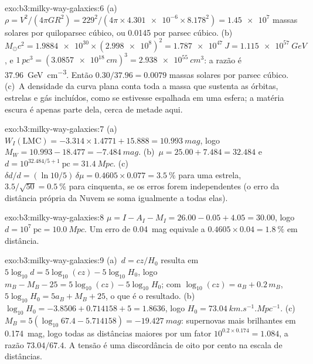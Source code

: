 \begin{solution}{exo:b3:milky-way-galaxies:6}
(a)~$\rho = V^2/(4\pi GR^2) = 229^2/(4\pi\times\num{4.301e-6}\times
8.178^2) = \num{1.45e7}$ massas solares por quiloparsec cúbico, ou
\num{0.0145} por parsec cúbico. (b)~$M_\odot c^2 = \num{1.9884e30}\times
(\num{2.998e8})^2 = \qty{1.787e47}{J} = \qty{1.115e57}{GeV}$, e
$\qty{1}{pc^3} = (\qty{3.0857e18}{cm})^3 = \qty{2.938e55}{cm^3}$: a
razão é \qty{37.96}{GeV.cm^{-3}}. Então $0.30/37.96 = \num{0.0079}$ massas solares
por parsec cúbico. (c)~A densidade da curva plana conta toda a massa
que sustenta as órbitas, estrelas e gás incluídos, como se estivesse espalhada em uma
esfera; a matéria escura é apenas parte dela, cerca de metade aqui.
\end{solution}

\begin{solution}{exo:b3:milky-way-galaxies:7}
(a)~$W_I(\mathrm{LMC}) = -3.314\times1.4771 + 15.888 = \qty{10.993}{mag}$,
logo $M_W = 10.993 - 18.477 = \qty{-7.484}{mag}$. (b)~$\mu = 25.00 + 7.484 =
32.484$ e $d = 10^{32.484/5 + 1}~\mathrm{pc} = \qty{31.4}{Mpc}$.
(c)~$\delta d/d = (\ln 10/5)\,\delta\mu = 0.4605\times0.077 =
\qty{3.5}{\percent}$ para uma estrela, $3.5/\sqrt{50} = \qty{0.5}{\percent}$
para cinquenta, se os erros forem independentes (o erro da distância própria da Nuvem
se soma igualmente a todas elas).
\end{solution}

\begin{solution}{exo:b3:milky-way-galaxies:8}
$\mu = I - A_I - M_I = 26.00 - 0.05 + 4.05 = 30.00$, logo $d =
10^{7}~\mathrm{pc} = \qty{10.0}{Mpc}$. Um erro de \qty{0.04}{mag} equivale a
$0.4605\times0.04 = \qty{1.8}{\percent}$ em distância.
\end{solution}

\begin{solution}{exo:b3:milky-way-galaxies:9}
(a)~$d = cz/H_0$ resulta em $5\log_{10}d = 5\log_{10}(cz) - 5\log_{10}H_0$,
logo $m_B - M_B - 25 = 5\log_{10}(cz) - 5\log_{10}H_0$; com
$\log_{10}(cz) = a_B + 0.2\,m_B$, $5\log_{10}H_0 = 5a_B + M_B + 25$, o que
é o resultado. (b)~$\log_{10}H_0 = -3.8506 + 0.714158 + 5 = 1.8636$, logo
$H_0 = \qty{73.04}{km.s^{-1}.Mpc^{-1}}$. (c)~$M_B = 5(\log_{10}67.4 -
5.714158) = \qty{-19.427}{mag}$: supernovas mais brilhantes em \qty{0.174}{mag},
logo todas as distâncias maiores por um fator $10^{0.2\times0.174} = 1.084$, a
razão $73.04/67.4$. A tensão é uma discordância de oito por cento na
escala de distâncias.
\end{solution}


